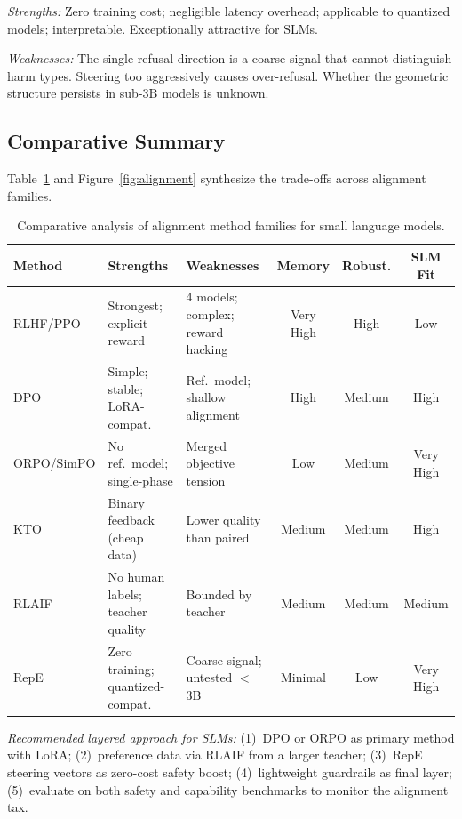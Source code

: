 \documentclass[12pt,a4paper]{article}
\begin{document}
\emph{Strengths:} Zero training cost; negligible latency overhead; applicable to quantized models; interpretable. Exceptionally attractive for SLMs.

\emph{Weaknesses:} The single refusal direction is a coarse signal that cannot distinguish harm types. Steering too aggressively causes over-refusal. Whether the geometric structure persists in sub-3B models is unknown.

\subsection{Comparative Summary}

Table~\ref{tab:alignment_comparison} and Figure~\ref{fig:alignment} synthesize the trade-offs across alignment families.

\begin{table}[t]
\centering
\caption{Comparative analysis of alignment method families for small language models.}\label{tab:alignment_comparison}
\small
\begin{tabular}{@{}lp{3.5cm}p{3.5cm}ccc@{}}
\toprule
\textbf{Method} & \textbf{Strengths} & \textbf{Weaknesses} & \textbf{Memory} & \textbf{Robust.} & \textbf{SLM Fit} \\
\midrule
RLHF/PPO & Strongest; explicit reward & 4 models; complex; reward hacking & Very High & High & Low \\
DPO & Simple; stable; LoRA-compat. & Ref.\ model; shallow alignment & High & Medium & High \\
ORPO/SimPO & No ref.\ model; single-phase & Merged objective tension & Low & Medium & Very High \\
KTO & Binary feedback (cheap data) & Lower quality than paired & Medium & Medium & High \\
RLAIF & No human labels; teacher quality & Bounded by teacher & Medium & Medium & Medium \\
RepE & Zero training; quantized-compat. & Coarse signal; untested $<$3B & Minimal & Low & Very High \\
\bottomrule
\end{tabular}
\end{table}

\emph{Recommended layered approach for SLMs:} (1)~DPO or ORPO as primary method with LoRA; (2)~preference data via RLAIF from a larger teacher; (3)~RepE steering vectors as zero-cost safety boost; (4)~lightweight guardrails as final layer; (5)~evaluate on both safety and capability benchmarks to monitor the alignment tax.
\end{document}
